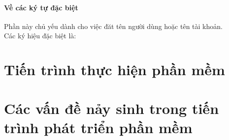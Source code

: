 \documentclass[12pt,a4paper]{report}
\begin{document}
		\subsubsection{Về các ký tự đặc biệt}
		Phần này chủ yếu dành cho việc đăt tên người dùng hoặc tên tài khoản.\\
		Các ký hiệu đặc biệt là: %
\chapter{Tiến trình thực hiện phần mềm}
\chapter{Các vấn đề nảy sinh trong tiến trình phát triển phần mềm}
\end{document}
